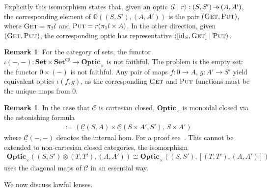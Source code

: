 \documentclass[11pt,a4paper]{article}
\theoremstyle{plain}
\theoremstyle{definition}
\newtheorem{remark}[theorem]{Remark}
\newcommand{\C}{\mathscr{C}}
\newcommand{\homC}{\underline{\C}}
\newcommand{\Set}{\mathbf{Set}}
\newcommand{\Optic}{\mathbf{Optic}}
\newcommand{\id}{\mathrm{id}}
\newcommand{\op}{\mathrm{op}}
\newcommand{\rep}[2]{{\ensuremath \left\langle #1 \mid #2 \right\rangle}}
\newcommand{\fget}{\textsc{Get}}
\newcommand{\fput}{\textsc{Put}}
\newcommand{\hto}{\ensuremath{\,\mathaccent\shortmid\rightarrow\,}}
\begin{document}
Explicitly this isomorphism states that, given an optic $\rep{l}{r } : (S, S') \hto (A, A')$, the corresponding element of $\mathbb{O}((S, S'), (A, A'))$ is the pair $(\fget, \fput)$, where $\fget = \pi_2 l$ and $\fput = r (\pi_1 l \times A)$. In the other direction, given $(\fget, \fput)$, the corresponding optic has representative $\rep{[\id_S, \fget]}{\fput}$.

\begin{remark}\label{lens-iota-not-faithful}
  For the category of sets, the functor $\iota(-, -) : \Set \times \Set^\op \to \Optic_\times$ is not faithful. The problem is the empty set: the functor $0 \times (-)$ is not faithful. Any pair of maps $f : 0 \to A$, $g : A' \to S'$ yield equivalent optics $\iota(f, g)$, as the corresponding $\fget$ and $\fput$ functions must be the unique maps from $0$.
\end{remark}

\begin{remark}
  In the case that $\C$ is cartesian closed, $\Optic_\times$ is monoidal closed via the astonishing formula
  \begin{align*}
    [(S, S'), (A, A')] := (\homC(S, A) \times \homC(S \times A', S'), \, S \times A')
  \end{align*}
  where $\homC(-, -)$ denotes the internal hom. For a proof see~\cite[Section 1.2]{DialecticaCategories}. This cannot be extended to non-cartesian closed categories, the isomorphism
  \begin{align*}
    \Optic_\times((S, S') \otimes (T, T'), (A, A')) \cong \Optic_\times((S, S'),  [(T, T'), (A, A')])
  \end{align*}
  uses the diagonal maps of $\C$ in an essential way.
\end{remark}

We now discuss lawful lenses.
\end{document}

